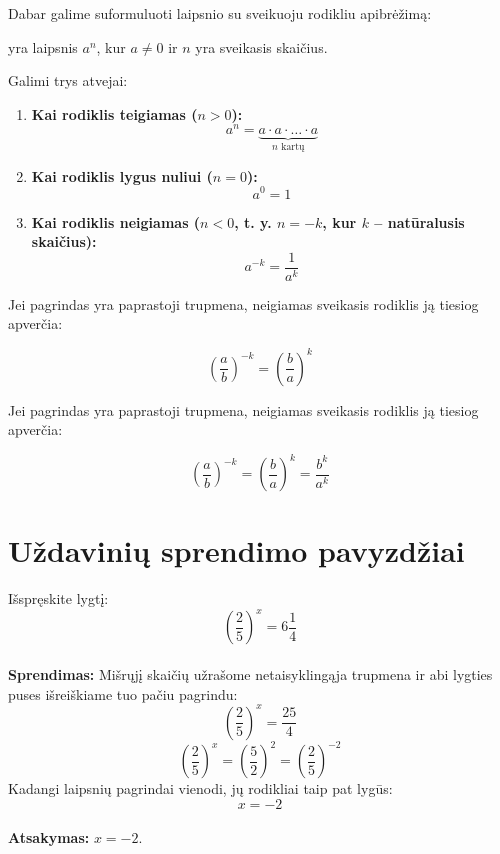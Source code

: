 \documentclass[11pt,a4paper]{scrartcl}
\begin{document}
Dabar galime suformuluoti laipsnio su sveikuoju rodikliu apibrėžimą:
\begin{definition}
    yra laipsnis $a^n$, kur  $a \neq 0$ ir $n$ yra sveikasis skaičius.
\end{definition}
Galimi trys atvejai:
\begin{enumerate}
    \item \textbf{Kai rodiklis teigiamas ($n > 0$):} 
    $$a^n = \underbrace{a \cdot a \cdot \dots \cdot a}_{n \text{ kartų}}$$
    
    \item \textbf{Kai rodiklis lygus nuliui ($n = 0$):} 
    $$a^0 = 1$$
    
    \item \textbf{Kai rodiklis neigiamas ($n < 0$, t. y. $n = -k$, kur $k$ -- natūralusis skaičius):}
    $$a^{-k} = \frac{1}{a^k}$$
\end{enumerate}
\begin{remark}
Jei pagrindas yra paprastoji trupmena, neigiamas sveikasis rodiklis ją tiesiog apverčia:

$$\left(\frac{a}{b}\right)^{-k} = \left(\frac{b}{a}\right)^k $$
\end{remark}

Jei pagrindas yra paprastoji trupmena, neigiamas sveikasis rodiklis ją tiesiog apverčia:

$$\left(\frac{a}{b}\right)^{-k} = \left(\frac{b}{a}\right)^k = \frac{b^k}{a^k}$$

\section{Uždavinių sprendimo pavyzdžiai}

\begin{example}
Išspręskite lygtį:
$$\left(\frac{2}{5}\right)^x = 6\frac{1}{4}$$\\
\textbf{Sprendimas:} Mišrųjį skaičių užrašome netaisyklingąja trupmena ir abi lygties puses išreiškiame tuo pačiu pagrindu:
$$\left(\frac{2}{5}\right)^x = \frac{25}{4}$$
$$\left(\frac{2}{5}\right)^x = \left(\frac{5}{2}\right)^2 = \left(\frac{2}{5}\right)^{-2}$$
Kadangi laipsnių pagrindai vienodi, jų rodikliai taip pat lygūs:
$$x = -2$$\\
\textbf{Atsakymas:} $x = -2$.
\end{example}
\end{document}
